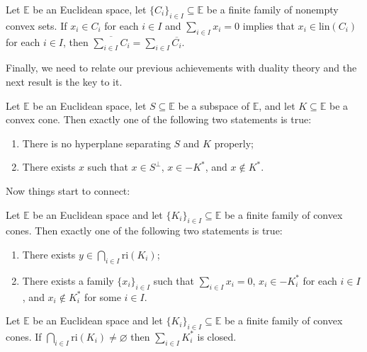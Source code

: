 \documentclass[a4paper]{article}
\begin{document}
\begin{corollary}\label{somafechada}
  Let \(\mathbb{E}\) be an Euclidean space, let \(\{C_i\}_{i\in I}\subseteq\mathbb{E}\) be a finite
  family of nonempty convex sets. If \(x_i\in C_i\) for each \(i\in I\) and \(\sum_{i\in
    I}x_i=0\) implies that \(x_i\in\text{lin}(C_i)\) for each \(i\in I\), then
  \(\overline{\sum_{i\in I}C_i}=\sum_{i\in I}\overline{C_i}\).
\end{corollary}

Finally, we need to relate our previous achievements with duality theory
and the next result is the key to it.

\begin{lemma}\label{requisitocondicoes}
  Let $\mathbb{E}$ be an Euclidean space, let $S\subseteq\mathbb{E}$ be a subspace
  of $\mathbb{E}$, and let \(K\subseteq\mathbb{E}\) be a convex cone. Then exactly one of the following two
  statements is true:
  \begin{enumerate}[label=(\roman*)]
  \item There is no hyperplane separating \(S\) and \(K\) properly;
  \item There exists \(x\) such that \(x\in S^\bot\), \(x\in -K^\ast\), and
    \(x\not\in K^\ast\). 
  \end{enumerate}
\end{lemma}

Now things start to connect:

\begin{corollary}\label{umprimeiro}
  Let \(\mathbb{E}\) be an Euclidean space and let \(\{K_i\}_{i\in I}\subseteq\mathbb{E}\) be a
  finite family of convex cones. Then exactly one of the following two statements is
  true:
  \begin{enumerate}[label=(\roman*)]
  \item There exists \(y\in\bigcap_{i\in I}\text{ri}(K_i)\);
  \item There exists a family \(\{x_i\}_{i\in I}\) such that \(\sum_{i\in
      I}x_i=0\), \(x_i\in -K_i^\ast\) for each \(i\in I\), and \(x_i\not\in
    K_i^\ast\) for some \(i\in I\).
  \end{enumerate}
\end{corollary}
\begin{corollary}\label{corcor}
  Let \(\mathbb{E}\) be an Euclidean space and let \(\{K_i\}_{i\in I}\subseteq\mathbb{E}\) be a
  finite family of convex cones. If \(\bigcap_{i\in I}\text{ri}(K_i)\not=\varnothing\)
  then \(\sum_{i\in I }K_i^\ast\) is closed. 
\end{corollary}
\end{document}
